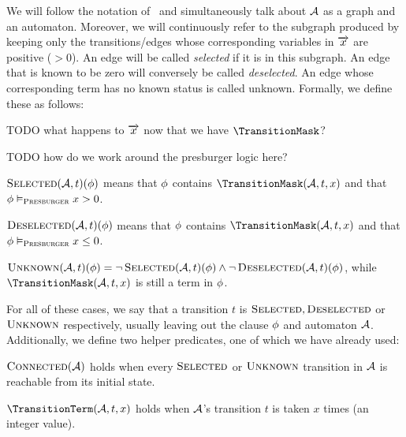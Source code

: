 \documentclass[runningheads]{llncs}
\begin{document}
We will follow the notation of~\cite{generate-parikh-image} and simultaneously talk
about $\mathcal{A}$ as a graph and an automaton. Moreover, we will continuously
refer to the subgraph produced by keeping only the transitions/edges whose
corresponding variables in $\overrightarrow{x}$ are positive ($> 0$). An edge will
be called \textit{selected} if it is in this subgraph. An edge that is known to be zero
will conversely be called \textit{deselected}. An edge whose corresponding term has no
known status is called unknown. Formally, we define these as follows:

TODO what happens to $\overrightarrow{x}$ now that we have $\TransitionMask$?

TODO how do we work around the presburger logic here?

\begin{definition}
  $\operatorname{\textsc{Selected}}(\mathcal{A}, t)(\phi)$ means that $\phi$ contains $\TransitionMask(\Automaton, t, x)$ and that $\phi \vDash_{\textsc{Presburger}} x > 0$.
  \end{definition}
  
  \begin{definition}
    $\operatorname{\textsc{Deselected}}(\mathcal{A}, t)(\phi)$ means that $\phi$ contains $\TransitionMask(\Automaton, t, x)$ and that $\phi \vDash_{\textsc{Presburger}} x \leq 0$.
    \end{definition}
    
  \begin{definition}
  $\operatorname{\textsc{Unknown}}(\mathcal{A}, t)(\phi) = \lnot\operatorname{\textsc{Selected}}(\mathcal{A}, t)(\phi)\land\lnot\operatorname{\textsc{Deselected}}(\mathcal{A}, t)(\phi)$, while $\TransitionMask(\Automaton, t, x)$ is still a term in $\phi$.
  \end{definition}

  For all of these cases, we say that a transition $t$ is $\operatorname{\textsc{Selected}},
  \operatorname{\textsc{Deselected}}$ or $\operatorname{\textsc{Unknown}}$ respectively, usually leaving out the clause
  $\phi$ and automaton $\mathcal{A}$. Additionally, we define two helper
  predicates, one of which we have already used:

  \begin{definition}
    $\operatorname{\textsc{Connected}}(\mathcal{A})$ holds when every $\operatorname{\textsc{Selected}}$ or $\operatorname{\textsc{Unknown}}$ transition in $\mathcal{A}$ is reachable from its initial state.
  \end{definition}

  \begin{definition}
    $\TransitionTerm(\Automaton, t, x)$ holds when $\mathcal{A}$'s transition $t$ is taken $x$ times (an integer value).
  \end{definition}
\end{document}
